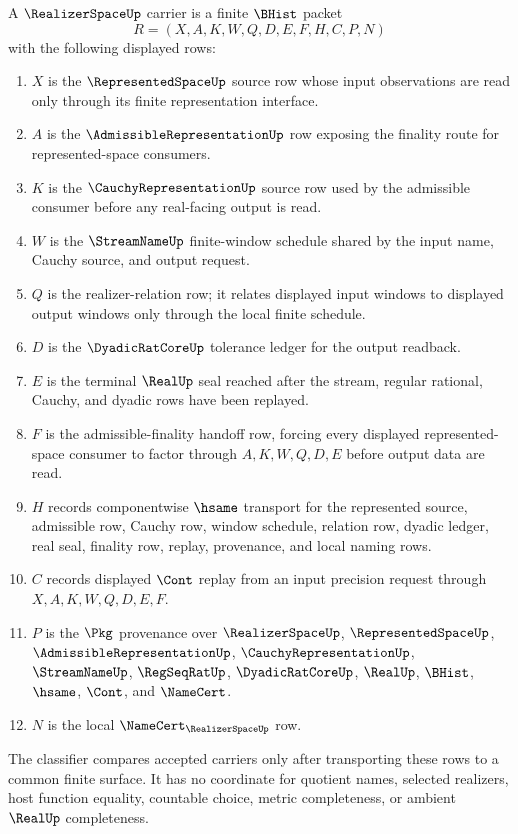 \begin{definition}
\label{def:realizer-space-carrier}
A $\RealizerSpaceUp$ carrier is a finite $\BHist$ packet
$$
R=(X,A,K,W,Q,D,E,F,H,C,P,N)
$$
with the following displayed rows:
\begin{enumerate}
\item $X$ is the $\RepresentedSpaceUp$ source row whose input observations are
read only through its finite representation interface.
\item $A$ is the $\AdmissibleRepresentationUp$ row exposing the finality route
for represented-space consumers.
\item $K$ is the $\CauchyRepresentationUp$ source row used by the admissible
consumer before any real-facing output is read.
\item $W$ is the $\StreamNameUp$ finite-window schedule shared by the input
name, Cauchy source, and output request.
\item $Q$ is the realizer-relation row; it relates displayed input windows to
displayed output windows only through the local finite schedule.
\item $D$ is the $\DyadicRatCoreUp$ tolerance ledger for the output readback.
\item $E$ is the terminal $\RealUp$ seal reached after the stream, regular
rational, Cauchy, and dyadic rows have been replayed.
\item $F$ is the admissible-finality handoff row, forcing every displayed
represented-space consumer to factor through $A,K,W,Q,D,E$ before output data
are read.
\item $H$ records componentwise $\hsame$ transport for the represented source,
admissible row, Cauchy row, window schedule, relation row, dyadic ledger, real
seal, finality row, replay, provenance, and local naming rows.
\item $C$ records displayed $\Cont$ replay from an input precision request
through $X,A,K,W,Q,D,E,F$.
\item $P$ is the $\Pkg$ provenance over $\RealizerSpaceUp$,
$\RepresentedSpaceUp$, $\AdmissibleRepresentationUp$,
$\CauchyRepresentationUp$, $\StreamNameUp$, $\RegSeqRatUp$,
$\DyadicRatCoreUp$, $\RealUp$, $\BHist$, $\hsame$, $\Cont$, and $\NameCert$.
\item $N$ is the local $\NameCert_{\RealizerSpaceUp}$ row.
\end{enumerate}
The classifier compares accepted carriers only after transporting these rows to
a common finite surface. It has no coordinate for quotient names, selected
realizers, host function equality, countable choice, metric completeness, or
ambient $\RealUp$ completeness.
\end{definition}

